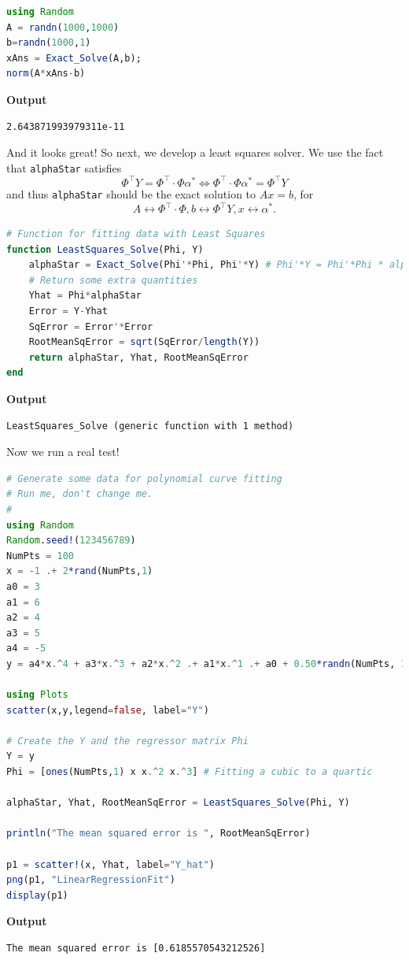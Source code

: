 \begin{lstlisting}[language=Julia,style=mystyle]
using Random
A = randn(1000,1000)
b=randn(1000,1)
xAns = Exact_Solve(A,b);
norm(A*xAns-b)
\end{lstlisting}
\textbf{Output} 
\begin{verbatim}
2.643871993979311e-11
\end{verbatim}

And it looks great! So next, we develop a least squares solver. We use the fact that \texttt{alphaStar} satisfies
$$ \Phi^\top Y = \Phi^\top \cdot \Phi \alpha^\ast \iff \Phi^\top \cdot \Phi \alpha^\ast = \Phi^\top Y $$
and thus \texttt{alphaStar} should be the exact solution to $Ax=b$, for 
$$A \longleftrightarrow\Phi^\top \cdot \Phi , b\longleftrightarrow \Phi^\top Y, x \longleftrightarrow \alpha^\ast. $$


\begin{lstlisting}[language=Julia,style=mystyle]
# Function for fitting data with Least Squares
function LeastSquares_Solve(Phi, Y)
    alphaStar = Exact_Solve(Phi'*Phi, Phi'*Y) # Phi'*Y = Phi'*Phi * alpha
    # Return some extra quantities
    Yhat = Phi*alphaStar
    Error = Y-Yhat
    SqError = Error'*Error
    RootMeanSqError = sqrt(SqError/length(Y))
    return alphaStar, Yhat, RootMeanSqError
end
\end{lstlisting}
\textbf{Output} 
\begin{verbatim}
LeastSquares_Solve (generic function with 1 method)
\end{verbatim}

Now we run a real test!

\begin{lstlisting}[language=Julia,style=mystyle]
# Generate some data for polynomial curve fitting
# Run me, don't change me.
#
using Random
Random.seed!(123456789)
NumPts = 100
x = -1 .+ 2*rand(NumPts,1)
a0 = 3
a1 = 6
a2 = 4
a3 = 5
a4 = -5
y = a4*x.^4 + a3*x.^3 + a2*x.^2 .+ a1*x.^1 .+ a0 + 0.50*randn(NumPts, 1)

using Plots
scatter(x,y,legend=false, label="Y")

# Create the Y and the regressor matrix Phi
Y = y
Phi = [ones(NumPts,1) x x.^2 x.^3] # Fitting a cubic to a quartic

alphaStar, Yhat, RootMeanSqError = LeastSquares_Solve(Phi, Y)

println("The mean squared error is ", RootMeanSqError)

p1 = scatter!(x, Yhat, label="Y_hat")
png(p1, "LinearRegressionFit") 
display(p1)
\end{lstlisting}
\textbf{Output} 
\begin{verbatim}
The mean squared error is [0.6185570543212526]
\end{verbatim}



